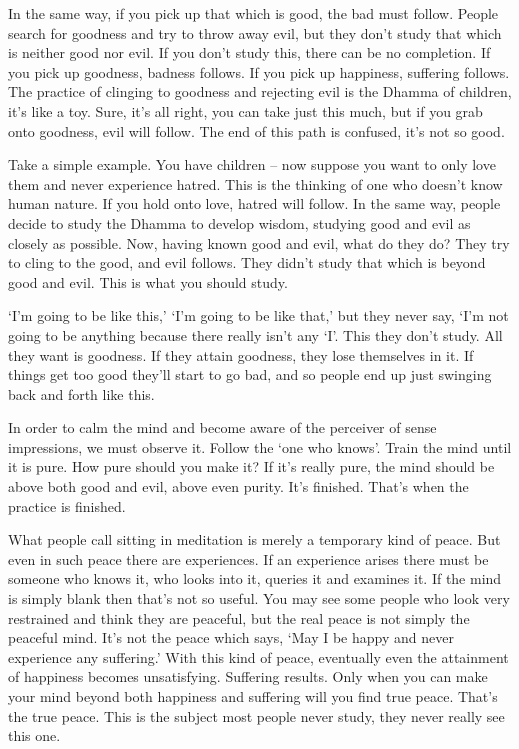 In the same way, if you pick up that which is good, the bad must follow. People search for goodness and try to throw away evil, but they don't study that which is neither good nor evil. If you don't study this, there can be no completion. If you pick up goodness, badness follows. If you pick up happiness, suffering follows. The practice of clinging to goodness and rejecting evil is the Dhamma of children, it's like a toy. Sure, it's all right, you can take just this much, but if you grab onto goodness, evil will follow. The end of this path is confused, it's not so good.

Take a simple example. You have children -- now suppose you want to only love them and never experience hatred. This is the thinking of one who doesn't know human nature. If you hold onto love, hatred will follow. In the same way, people decide to study the Dhamma to develop wisdom, studying good and evil as closely as possible. Now, having known good and evil, what do they do? They try to cling to the good, and evil follows. They didn't study that which is beyond good and evil. This is what you should study.

`I'm going to be like this,' `I'm going to be like that,' but they never say, `I'm not going to be anything because there really isn't any `I'. This they don't study. All they want is goodness. If they attain goodness, they lose themselves in it. If things get too good they'll start to go bad, and so people end up just swinging back and forth like this.

In order to calm the mind and become aware of the perceiver of sense impressions, we must observe it. Follow the `one who knows'. Train the mind until it is pure. How pure should you make it? If it's really pure, the mind should be above both good and evil, above even purity. It's finished. That's when the practice is finished.

What people call sitting in meditation is merely a temporary kind of peace. But even in such peace there are experiences. If an experience arises there must be someone who knows it, who looks into it, queries it and examines it. If the mind is simply blank then that's not so useful. You may see some people who look very restrained and think they are peaceful, but the real peace is not simply the peaceful mind. It's not the peace which says, `May I be happy and never experience any suffering.' With this kind of peace, eventually even the attainment of happiness becomes unsatisfying. Suffering results. Only when you can make your mind beyond both happiness and suffering will you find true peace. That's the true peace. This is the subject most people never study, they never really see this one.

